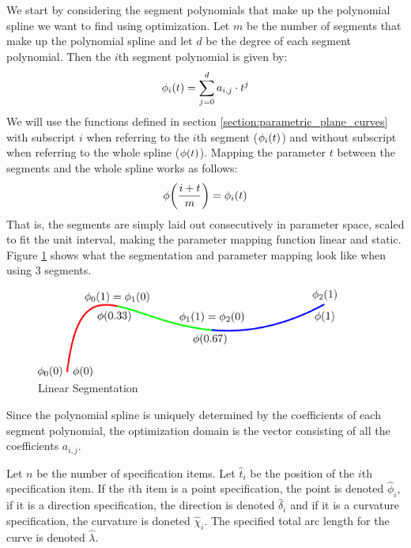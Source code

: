 \documentclass[a4paper]{article}
\begin{document}
				We start by considering the segment polynomials that make up the polynomial spline we want to find using optimization. Let \(m\) be the number of segments that make up the polynomial spline and let \(d\) be the degree of each segment polynomial. Then the \(i\)th segment polynomial is given by:
				\begin{equation*}
					\phi_i\!\left( t \right) = \sum_{j = 0}^{d} a_{i,j} \cdot t^j
				\end{equation*}
				We will use the functions defined in section \ref{section:parametric_plane_curves} with subscript \(i\) when referring to the \(i\)th segment (\(\phi_i\!\left( t \right)\)) and without subscript when referring to the whole spline (\(\phi\!\left( t \right)\)). Mapping the parameter \(t\) between the segments and the whole spline works as follows:
				\begin{equation*}
					\phi\!\left( \frac{i + t}{m} \right) = \phi_i\!\left( t \right)
				\end{equation*}
				That is, the segments are simply laid out consecutively in parameter space, scaled to fit the unit interval, making the parameter mapping function linear and static. Figure \ref{figure:linear_segmentation} shows what the segmentation and parameter mapping look like when using 3 segments.

				\begin{figure}[htbp]
					\centering
					\includegraphics[width=100mm]{content/output/linear_segmentation.pdf}
					\caption{Linear Segmentation}
					\label{figure:linear_segmentation}
				\end{figure}

				Since the polynomial spline is uniquely determined by the coefficients of each segment polynomial, the optimization domain is the vector consisting of all the coefficients \(a_{i,j}\).

				Let \(n\) be the number of specification items. Let \(\hat{t}_i\) be the position of the \(i\)th specification item. If the \(i\)th item is a point specification, the point is denoted \(\hat{\phi}_i\), if it is a direction specification, the direction is denoted \(\hat{\delta}_i\) and if it is a curvature specification, the curvature is doneted \(\hat{\chi}_i\). The specified total arc length for the curve is denoted \(\hat{\lambda}\).
\end{document}
